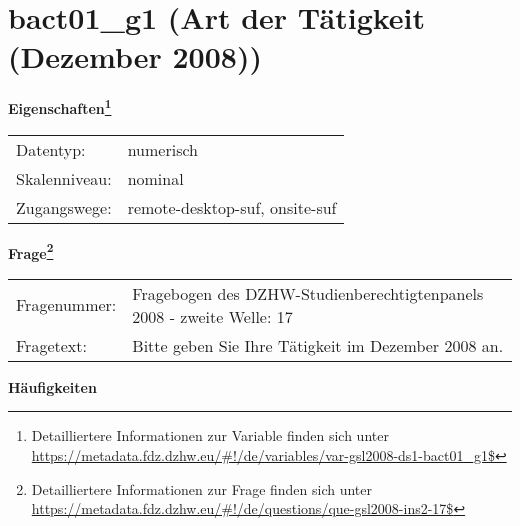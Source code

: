 
    \setcounter{footnote}{0}

    \vspace*{-1.8cm}
	\section{bact01\_g1 (Art der Tätigkeit (Dezember 2008))}
	\label{section:bact01_g1}



    \vspace*{0.5cm}
    \noindent\textbf{Eigenschaften\footnote{Detailliertere Informationen zur Variable finden sich unter
		\url{https://metadata.fdz.dzhw.eu/\#!/de/variables/var-gsl2008-ds1-bact01_g1$}}}\\
	\begin{tabularx}{\hsize}{@{}lX}
	Datentyp: & numerisch \\
	Skalenniveau: & nominal \\
	Zugangswege: &
	  remote-desktop-suf, 
	  onsite-suf
 \\
    \end{tabularx}



				\vspace*{0.5cm}
                \noindent\textbf{Frage\footnote{Detailliertere Informationen zur Frage finden sich unter
		              \url{https://metadata.fdz.dzhw.eu/\#!/de/questions/que-gsl2008-ins2-17$}}}\\
				\begin{tabularx}{\hsize}{@{}lX}
					Fragenummer: &
					  Fragebogen des DZHW-Studienberechtigtenpanels 2008 - zweite Welle:
					  17
 \\
					Fragetext: & Bitte geben Sie Ihre Tätigkeit im Dezember 2008 an. \\
				\end{tabularx}





        		\vspace*{0.5cm}
                \noindent\textbf{Häufigkeiten}

